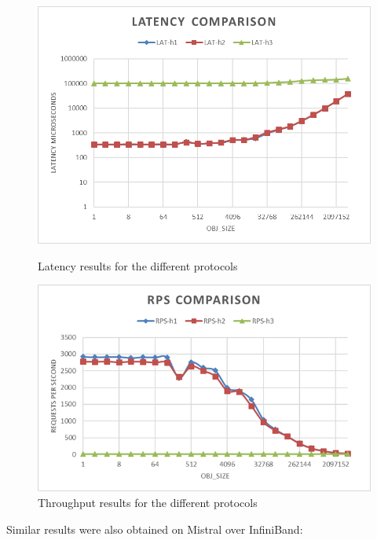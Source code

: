 \documentclass[runningheads]{llncs}
\begin{document}
\begin{figure}[H]
    \centering
    \begin{minipage}{0.49\textwidth}
        \centering
        \includegraphics[width=1\textwidth]{lat-comparison-h2load.png}
        \caption{Latency results for the different protocols}
		\label {fig:lat-comp}
    \end{minipage}\hfill
    \begin{minipage}{0.49\textwidth}
        \centering
        \includegraphics[width=1\textwidth]{rps-comparison-h2load.png}
        \caption{Throughput results for the different protocols}
		\label {fig:rps-comp}
    \end{minipage}
\end{figure}

Similar results were also obtained on Mistral over InfiniBand:
\end{document}
